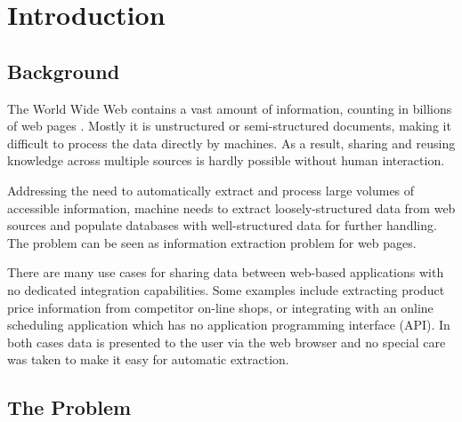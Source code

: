 \chapter{Introduction}
\label{ch:intro}


\section{Background} %
\label{sec:Problem}


The World Wide Web contains a vast amount of information, counting in billions of web pages \cite{signorini2005a}. Mostly it is unstructured or semi-structured documents, making it difficult to process the data directly by machines. As a result, sharing and reusing knowledge across multiple sources is hardly possible without human interaction.

Addressing the need to automatically extract and process large volumes of accessible information, machine needs to extract loosely-structured data from web sources and populate databases with well-structured data for further handling. The problem can be seen as information extraction problem for web pages. 

There are many use cases for sharing data between web-based applications with no dedicated integration capabilities. Some examples include extracting product price information from competitor on-line shops, or integrating with an online scheduling application which has no application programming interface (API). In both cases data is presented to the user via the web browser and no special care was taken to make it easy for automatic extraction.


\section{The Problem}

 
